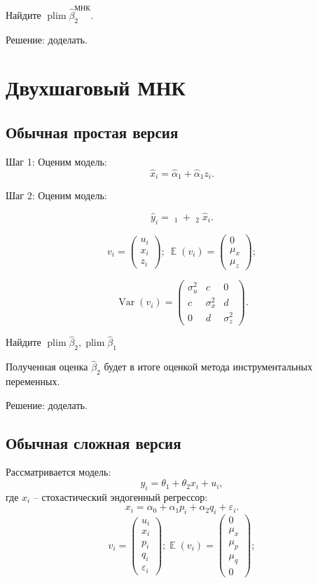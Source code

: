 \documentclass[10pt, a4paper]{extarticle}
\DeclareMathOperator{\E}{\mathbb{E}}
\DeclareMathOperator{\plim}{plim}
\DeclareMathOperator{\Var}{Var}
\DeclareMathOperator{\hb}{\hat{\beta}}
\begin{document}
Найдите $\plim \hat \beta_{2}^{\text{МНК}}$.

Решение: доделать.

\section{Двухшаговый МНК}

\subsection{Обычная простая версия}

Шаг 1: Оценим модель:
\[
\hat{x}_i = \hat{\alpha}_1 + \hat{\alpha}_1 z_i.
\]

Шаг 2: Оценим модель:

\[
\hat{y}_i = \hb_1 + \hb_2 \hat{x}_i.
\]

\[
v_{i} = \begin{pmatrix}  u_{i} \\ x_{i} \\  z_{i} \end{pmatrix}; \ \E(v_{i}) = \begin{pmatrix}  0 \\ \mu_{x} \\ \mu_{z} \end{pmatrix};
\]

\[
\Var(v_{i}) = \begin{pmatrix}  \sigma_{u}^2 & c & 0 \\
c & \sigma_{x}^2  & d \\
0 & d  & \sigma_z^2 \end{pmatrix}.
\]

Найдите $\plim \hat \beta_{2}, \plim \hat \beta_{1}$

Полученная оценка $\hat \beta_{2}$ будет в итоге оценкой метода инструментальных переменных.

Решение: доделать.


\subsection{Обычная сложная версия}

Рассматривается модель: 
\[
y_i = \theta_1 + \theta_2 x_i + u_i,
\]
где $x_i$ -- стохастический эндогенный
регрессор:
\[
x_i = \alpha_0 + \alpha_1 p_i + \alpha_2 q_i + \varepsilon_i.
\]
\[
v_{i} = \begin{pmatrix}  u_{i} \\ x_{i} \\  p_{i} \\ q_{i}  \\ \varepsilon_{i} \end{pmatrix}; \E(v_{i}) = \begin{pmatrix}  0 \\ \mu_{x} \\ \mu_{p} \\ \mu_{q} \\ 0\end{pmatrix};
\]
\end{document}
